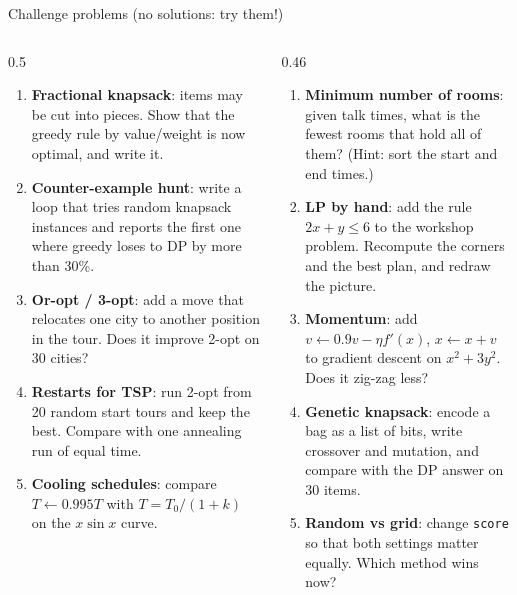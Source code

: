 \documentclass[aspectratio=169,10pt]{beamer}
\begin{document}
\begin{frame}{Challenge problems (no solutions: try them!)}
\begin{columns}[T]
\begin{column}{0.5\textwidth}
{\footnotesize
\begin{enumerate}\setlength\itemsep{3pt}
\item \textbf{Fractional knapsack}: items may be cut into pieces. Show that the greedy rule by value/weight is now optimal, and write it.
\item \textbf{Counter-example hunt}: write a loop that tries random knapsack instances and reports the first one where greedy loses to DP by more than 30\%.
\item \textbf{Or-opt / 3-opt}: add a move that relocates one city to another position in the tour. Does it improve 2-opt on 30 cities?
\item \textbf{Restarts for TSP}: run 2-opt from 20 random start tours and keep the best. Compare with one annealing run of equal time.
\item \textbf{Cooling schedules}: compare $T\leftarrow 0.995T$ with $T=T_0/(1+k)$ on the $x\sin x$ curve.
\end{enumerate}}
\end{column}
\begin{column}{0.46\textwidth}
{\footnotesize
\begin{enumerate}\setlength\itemsep{3pt}\setcounter{enumi}{5}
\item \textbf{Minimum number of rooms}: given talk times, what is the fewest rooms that hold all of them? (Hint: sort the start and end times.)
\item \textbf{LP by hand}: add the rule $2x+y\le6$ to the workshop problem. Recompute the corners and the best plan, and redraw the picture.
\item \textbf{Momentum}: add $v\leftarrow0.9v-\eta f'(x)$, $x\leftarrow x+v$ to gradient descent on $x^2+3y^2$. Does it zig-zag less?
\item \textbf{Genetic knapsack}: encode a bag as a list of bits, write crossover and mutation, and compare with the DP answer on 30 items.
\item \textbf{Random vs grid}: change \texttt{score} so that both settings matter equally. Which method wins now?
\end{enumerate}}
\end{column}
\end{columns}
\end{frame}
\end{document}
